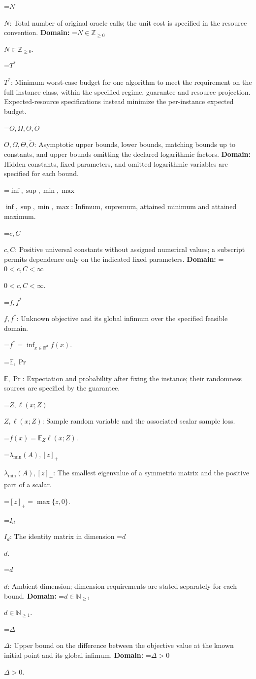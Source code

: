 \documentclass[10pt,a4paper]{article}
\newcommand{\AtlasMath}[1]{\par\begingroup\centering\setbox0=\hbox{$\displaystyle #1$}\ifdim\wd0>1.4\linewidth\typeout{ATLAS WIDE FORMULA: \the\wd0}\fi\ifdim\wd0>\linewidth\resizebox{\linewidth}{!}{\box0}\else\box0\fi\par\endgroup}
\newcommand{\AtlasInlineMath}[1]{\begingroup\setbox0=\hbox{$#1$}\ifdim\wd0>.4\linewidth\endgroup\AtlasMath{#1}\else\endgroup$#1$\fi}
\begin{document}
\AtlasInlineMath{N}: Total number of original oracle calls; the unit cost is specified in the resource convention. \textbf{Domain:} \AtlasInlineMath{N\in\mathbb{Z}_{\ge0}}.

\AtlasInlineMath{T^*}: Minimum worst-case budget for one algorithm to meet the requirement on the full instance class, within the specified regime, guarantee and resource projection. Expected-resource specifications instead minimize the per-instance expected budget.

\AtlasInlineMath{O,\Omega,\Theta,\widetilde{O}}: Asymptotic upper bounds, lower bounds, matching bounds up to constants, and upper bounds omitting the declared logarithmic factors. \textbf{Domain:} Hidden constants, fixed parameters, and omitted logarithmic variables are specified for each bound.

\AtlasInlineMath{\inf,\sup,\min,\max}: Infimum, supremum, attained minimum and attained maximum.

\AtlasInlineMath{c,C}: Positive universal constants without assigned numerical values; a subscript permits dependence only on the indicated fixed parameters. \textbf{Domain:} \AtlasInlineMath{0<c,C<\infty}.

\AtlasInlineMath{f,f^*}: Unknown objective and its global infimum over the specified feasible domain.


\AtlasMath{f^*=\inf_{x\in \mathbb{R}^d}f(x).}


\AtlasInlineMath{\mathbb{E},\Pr}: Expectation and probability after fixing the instance; their randomness sources are specified by the guarantee.

\AtlasInlineMath{Z,\ell(x;Z)}: Sample random variable and the associated scalar sample loss.


\AtlasMath{f(x)=\mathbb{E}_Z\ell(x;Z).}


\AtlasInlineMath{\lambda_{\min}(A),[z]_+}: The smallest eigenvalue of a symmetric matrix and the positive part of a scalar.


\AtlasMath{[z]_+=\max\{z,0\}.}


\AtlasInlineMath{I_d}: The identity matrix in dimension \AtlasInlineMath{d}.

\AtlasInlineMath{d}: Ambient dimension; dimension requirements are stated separately for each bound. \textbf{Domain:} \AtlasInlineMath{d\in\mathbb{N}_{\ge 1}}.

\AtlasInlineMath{\Delta}: Upper bound on the difference between the objective value at the known initial point and its global infimum. \textbf{Domain:} \AtlasInlineMath{\Delta>0}.
\end{document}
